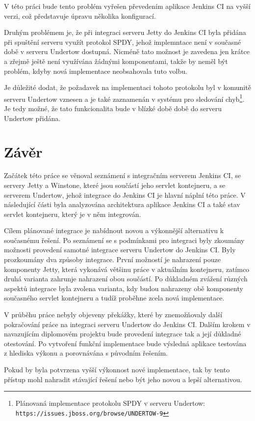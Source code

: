             V této práci bude tento problém vyřešen převedením aplikace Jenkins CI na vyšší verzi,
            což představuje úpravu několika konfigurací.

            \medskip        
            Druhým problémem je, že při integraci serveru Jetty do Jenkins CI byla přidána
            při spuštění serveru využít protokol SPDY, jehož implemntace
            není v současné době v serveru Undertow dostupná. Nicméně tato možnost
            je zavedena jen krátce a zřejmě ještě není využívána žádnými komponentami,
            takže by neměl být problém, kdyby nová implementace neobsahovala tuto volbu.
            
            Je důležité dodat, že požadavek na implementaci tohoto 
            protokolu byl v komunitě serveru Undertow vznesen
            a je také zaznamenán v systému pro sledování chyb\footnote{
                Plánovaná implementace protokolu SPDY v serveru Undertow:
                \texttt{https://issues.jboss.org/browse/UNDERTOW-9}}.
            Je tedy možné, že tato funkcionalita bude v blízké době době do serveru
            Undertow přidána.
            





\chapter{Závěr}
    Začátek této práce se věnoval seznámení s integračním serverem Jenkins CI,
    se servery Jetty a Winstone, které jsou součástí jeho servlet kontejneru,
    a se serverem Undertow, jehož integrace do Jenkins CI je hlavní
    náplní této práce. V následující části byla analyzována architektura aplikace Jenkins CI
    a také stav servlet kontejneru, který je v něm integrován.

    Cílem plánované integrace je nabídnout novou a výkonnější alternativu k současnému řešení.
    Po seznámení se s podmínkami pro integraci byly
    zkoumány možnosti provedení samotné integrace serveru Undertow do Jenkins CI.
    Byly prozkoumány dva způsoby integrace. První možností je nahrazení pouze komponenty
    Jetty, která vykonává většinu práce v aktuálním kontejneru, zatímco druhá varianta
    zahrunje nahrazení obou součástí. 
    Po důkladném zvážení různých aspektů integrace byla 
    zvolena varianta, kdy budou nahrazeny obě komponenty současného 
    servlet kontejneru a tudíž proběhne zcela nová implementace.

    V průběhu práce nebyly objeveny překážky, které by znemožňovaly další
    pokračování práce na integraci serveru Undertow do Jenkins CI.
    Dalším krokem v navazujícím diplomovém projektu bude provedení
    integrace tak a její důkladné otestování.
    Po vytvoření funkční implementace bude výsledná aplikace testována 
    z hlediska výkonu a porovnávána s původním řešením.

    Pokud by byla potvrzena vyšší výkonnost nové implementace, tak
    by tento přístup mohl nahradit stávající řešení nebo
    být jeho novou a lepší alternativou.






